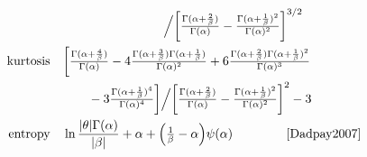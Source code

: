 \begin{table*}[pt!]
\begin{align*}
 \hspace{-3em}
 \\ & \qquad \qquad \qquad \qquad \Big /
 \Left[  \tfrac{\Gamma(\alpha+\frac{2}{\beta})}{\Gamma(\alpha)}  - 
\tfrac{\Gamma(\alpha+\frac{1}{\beta})^2}{\Gamma(\alpha)^2}    \Right]^{3/2}
\hspace{-3em}
\\
\text{kurtosis} \quad  &  
 \bigg[  \tfrac{\Gamma(\alpha+\frac{4}{\beta})}{\Gamma(\alpha)} 
 - 4 \tfrac{\Gamma(\alpha+\frac{3}{\beta})\Gamma(\alpha+\frac{1}{\beta})}{\Gamma(\alpha)^2}    
 + 6 \tfrac{\Gamma(\alpha+\frac{2}{\beta})\Gamma(\alpha+\frac{1}{\beta})^2}{\Gamma(\alpha)^3}    
\hspace{-3em}
 \\ & \qquad 
 -3  \tfrac{\Gamma(\alpha+\frac{1}{\beta})^4}{\Gamma(\alpha)^4}   \bigg]
 \Big /
 \Left[  \tfrac{\Gamma(\alpha+\frac{2}{\beta})}{\Gamma(\alpha)}  - 
\tfrac{\Gamma(\alpha+\frac{1}{\beta})^2}{\Gamma(\alpha)^2}    \Right]^{2}
-3 
\hspace{-3em}
\\
\text{entropy} \quad& 
\ln \frac{|\theta| \Gamma(\alpha)}{|\beta|} +\alpha + \Left( \sfrac{1}{\beta} - \alpha\Right) \psi(\alpha) \checked &
\text{\cite{Dadpay2007}}
\end{align*}
\end{table*}


